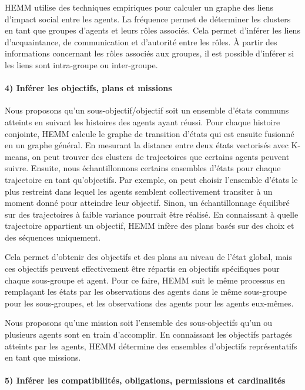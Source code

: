 \documentclass[sigconf,anonymous]{aamas}
\begin{document}
HEMM utilise des techniques empiriques pour calculer un graphe des liens d'impact social entre les agents. La fréquence permet de déterminer les clusters en tant que groupes d'agents et leurs rôles associés. Cela permet d'inférer les liens d'acquaintance, de communication et d'autorité entre les rôles. À partir des informations concernant les rôles associés aux groupes, il est possible d'inférer si les liens sont intra-groupe ou inter-groupe.

\paragraph{4) Inférer les objectifs, plans et missions}

Nous proposons qu'un sous-objectif/objectif soit un ensemble d'états communs atteints en suivant les histoires des agents ayant réussi.
Pour chaque histoire conjointe, HEMM calcule le graphe de transition d'états qui est ensuite fusionné en un graphe général. En mesurant la distance entre deux états vectorisés avec K-means, on peut trouver des clusters de trajectoires que certains agents peuvent suivre. Ensuite, nous échantillonnons certains ensembles d'états pour chaque trajectoire en tant qu'objectifs. Par exemple, on peut choisir l'ensemble d'états le plus restreint dans lequel les agents semblent collectivement transiter à un moment donné pour atteindre leur objectif. Sinon, un échantillonnage équilibré sur des trajectoires à faible variance pourrait être réalisé. En connaissant à quelle trajectoire appartient un objectif, HEMM infère des plans basés sur des choix et des séquences uniquement.

Cela permet d'obtenir des objectifs et des plans au niveau de l'état global, mais ces objectifs peuvent effectivement être répartis en objectifs spécifiques pour chaque sous-groupe et agent. Pour ce faire, HEMM suit le même processus en remplaçant les états par les observations des agents dans le même sous-groupe pour les sous-groupes, et les observations des agents pour les agents eux-mêmes.

Nous proposons qu'une mission soit l'ensemble des sous-objectifs qu'un ou plusieurs agents sont en train d'accomplir.
En connaissant les objectifs partagés atteints par les agents, HEMM détermine des ensembles d'objectifs représentatifs en tant que missions.

\paragraph{5) Inférer les compatibilités, obligations, permissions et cardinalités}
\end{document}
